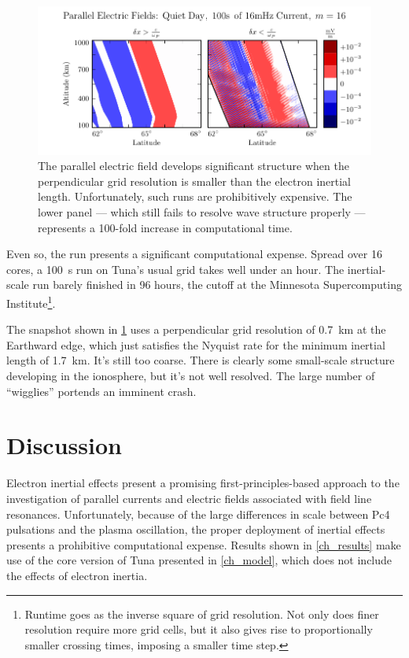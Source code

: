 \begin{figure}[!htb]
    \centering
    \includegraphics[width=\textwidth]{figures/inertial_length.pdf}
    \caption[Parallel Electric Fields by Perpendicular Grid Resolution]{
      The parallel electric field develops significant structure when the perpendicular grid resolution is smaller than the electron inertial length. Unfortunately, such runs are prohibitively expensive. The lower panel --- which still fails to resolve wave structure properly --- represents a 100-fold increase in computational time. 
    }
    \label{fig_inertial_length}
\end{figure}

Even so, the run presents a significant computational expense. Spread over 16 cores, a \SI{100}{\s} run on Tuna's usual grid takes well under an hour. The inertial-scale run barely finished in 96 hours, the cutoff at the Minnesota Supercomputing Institute\footnote{Runtime goes as the inverse square of grid resolution. Not only does finer resolution require more grid cells, but it also gives rise to proportionally smaller crossing times, imposing a smaller time step. }.

The snapshot shown in \cref{fig_inertial_length} uses a perpendicular grid resolution of \SI{0.7}{\km} at the Earthward edge, which just satisfies the Nyquist rate for the minimum inertial length of \SI{1.7}{\km}. It's still too coarse. There is clearly some small-scale structure developing in the ionosphere, but it's not well resolved. The large number of ``wigglies'' portends an imminent crash. 


\section{Discussion}

\todo{$\cdots$}

Electron inertial effects present a promising first-principles-based approach to the investigation of parallel currents and electric fields associated with field line resonances. Unfortunately, because of the large differences in scale between Pc4 pulsations and the plasma oscillation, the proper deployment of inertial effects presents a prohibitive computational expense. Results shown  in \cref{ch_results} make use of the core version of Tuna presented in \cref{ch_model}, which does not include the effects of electron inertia. 

\todo{$\cdots$}

